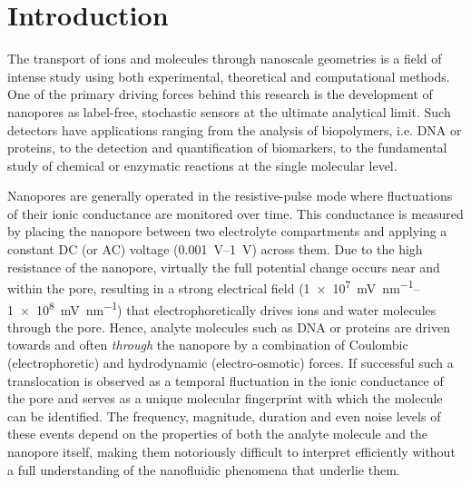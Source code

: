 \documentclass[journal=ancac3,manuscript=article,etalmode=truncate,maxauthors=0,layout=twocolumn]{achemso}
\begin{document}
\section{Introduction}

The transport of ions and molecules through nanoscale geometries is a field of intense study using both
experimental, theoretical and computational methods.\cite{Sparreboom-2010,Bocquet-2010,Maffeo-2012,
Thomas-2014,Wang-2014,Kim-2015} One of the primary driving forces behind this research is the development of
nanopores as label-free, stochastic sensors at the ultimate analytical limit.\cite{Bayley-2001,
Dekker-2007,Venkatesan-2011,Zhang-2016} Such detectors have applications ranging from the analysis of
biopolymers, i.e. DNA\cite{Deamer-2016,Kasianowicz-1996,Meller-2000,Maglia-2008,Butler-2008,Stoddart-2009,
Franceschini-2013,Jain-2018} or proteins,\cite{Restrepo-Perez-2018,Talaga-2009,Rodriguez-Larrea-2013,
Nivala-2013,Kennedy-2016} to the detection and quantification of biomarkers,\cite{Chen-2013,Soskine-2012,
Niedzwiecki-2013,VanMeervelt-2014,Huang-2017,Liu-2018,Galenkamp-2018} to the fundamental study of chemical or
enzymatic reactions at the single molecular level.\cite{Willems-VanMeervelt-2017,Lieberman-2010,
Nivala-2013,Ho-2015,Laszlo-2017}

Nanopores are generally operated in the resistive-pulse mode where fluctuations of their ionic conductance are
monitored over time.\cite{Bayley-2001,Dekker-2007,Maglia-2010,Venkatesan-2011} This conductance is measured by
placing the nanopore between two electrolyte compartments and applying a constant DC (or AC) voltage
(\SIrange{0.001}{1}{\volt}) across them. Due to the high resistance of the nanopore, virtually the full
potential change occurs near and within the pore, resulting in a strong electrical field
(\SIrange{1e7}{1e8}{\mV\per\nm}) that electrophoretically drives ions and water molecules through the
pore.\cite{Wong-2007,Mao-2014,Haywood-2014,Laohakunakorn-2015} Hence, analyte molecules such as DNA or
proteins are driven towards and often \emph{through} the nanopore by a combination of Coulombic
(electrophoretic) and hydrodynamic (electro-osmotic) forces.\cite{Wong-2007,Grosberg-2010,Muthukumar-2010,
Muthukumar-2014} If successful such a translocation is observed as a temporal fluctuation in the ionic
conductance of the pore and serves as a unique molecular fingerprint with which the molecule can be
identified.\cite{Yusko-2017} The frequency, magnitude, duration and even noise levels of these events depend
on the properties of both the analyte molecule and the nanopore itself, making them notoriously difficult to
interpret efficiently without a full understanding of the nanofluidic phenomena that underlie them.
\end{document}

